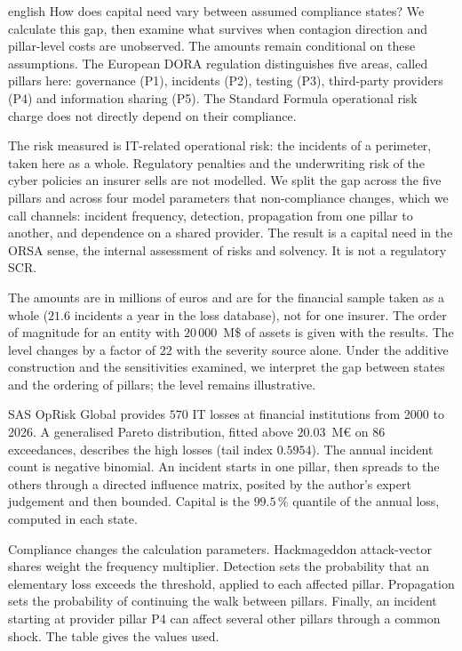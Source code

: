 
\begin{otherlanguage*}{english}
How does capital need vary between assumed compliance states? We calculate this gap, then
examine what survives when contagion direction and pillar-level costs are unobserved. The amounts
remain conditional on these assumptions. The European DORA regulation distinguishes five areas,
called pillars here: governance (P1), incidents (P2), testing (P3), third-party providers (P4) and
information sharing (P5). The Standard Formula operational risk charge does not directly depend
on their compliance.

The risk measured is IT-related operational risk: the incidents of a perimeter, taken here as a whole.
Regulatory penalties and the underwriting risk of the cyber policies an insurer sells are not
modelled. We split the gap across the five pillars and across four model parameters that
non-compliance changes, which we call channels: incident frequency, detection, propagation from one
pillar to another, and dependence on a shared provider. The result is a capital need in the ORSA
sense, the internal assessment of risks and solvency. It is not a regulatory SCR.

The amounts are in millions of euros and are for the financial sample taken as a whole
($21.6$ incidents a year in the loss database), not for one insurer. The order of magnitude for an
entity with $20\,000$~M\$ of assets is given with the results. The level changes by a factor of $22$ with the severity source alone. Under the additive construction and the sensitivities examined, we interpret the gap between states and the ordering of pillars; the level remains illustrative.

SAS OpRisk Global provides $570$ IT losses at financial institutions from 2000 to 2026. A generalised Pareto distribution, fitted above $20.03$~M\euro{} on $86$ exceedances, describes
the high losses (tail index $0.5954$). The annual
incident count is negative binomial. An incident starts in one pillar, then spreads to the others
through a directed influence matrix, posited by the author's expert judgement and then bounded.  Capital is the $99.5\,\%$ quantile
of the annual loss, computed in each state.

Compliance changes the calculation parameters. Hackmageddon attack-vector shares weight
the frequency multiplier. Detection sets the probability that an elementary loss exceeds
the threshold, applied to each affected pillar. Propagation sets the probability of continuing
the walk between pillars. Finally, an incident starting at provider pillar P4 can affect several
other pillars through a common shock. The table gives the values used.


\end{otherlanguage*}
